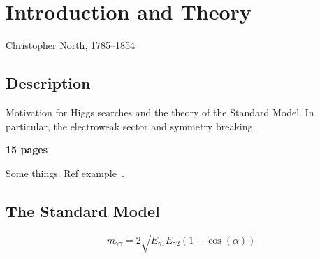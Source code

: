 \chapter{Introduction and Theory}
\label{chap:intro}
{Christopher North, 1785--1854}

\section{Description}

Motivation for Higgs searches and the theory of the Standard Model. In particular, the electroweak sector and symmetry breaking.

\textbf{15 pages}

Some things. Ref example~\cite{Phys.Rev.Lett.19.1264, Phys.Rev.D2.1285,hep-ph/0410370}.

\section{The Standard Model}
\label{sec:standardmodel}


\begin{equation}
	m_{\gamma\gamma} = 2\sqrt{E_{\gamma1}E_{\gamma2}(1-\cos(\alpha))}
	\label{eq:invmass}
\end{equation}
